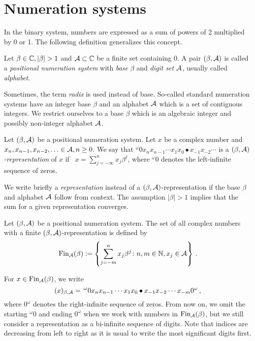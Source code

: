 
\section{Numeration systems}
In the binary system, numbers are expressed as a sum of powers of 2 multiplied by 0 or 1. The following definition generalizes this concept.
\begin{defn}
  Let $\beta \in \CC, |\beta|>1$ and $\mathcal{A} \subset \mathbb{C}$ be a finite set containing 0. A pair $(\beta, \mathcal{A})$ is called a \emph{positional numeration system} with \emph{base} $\beta$ and \emph{digit set} $\mathcal{A}$, usually called \emph{alphabet}.
\end{defn}
Sometimes, the term \emph{radix} is used instead of base. So-called standard numeration systems have an integer base $\beta$ and an alphabet $\mathcal{A}$ which is a set of contiguous integers. We restrict ourselves to a base $\beta$ which is an algebraic integer and possibly non-integer alphabet $\mathcal{A}$. 

\begin{defn}
Let $(\beta, \mathcal{A})$ be a positional numeration system. Let $x$ be a complex number and $x_n,x_{n-1}, x_{n-2},\ldots \in\mathcal{A}, n\geq 0$. We say that $^\omega0 x_n x_{n-1}\cdots x_1 x_0 \bullet x_{-1} x_{-2} \cdots $ is a \emph{$(\beta, \mathcal{A})$-representation} of $x$ if~  $x=\sum_{j=-\infty}^n x_j \beta^j$, where $^\omega0$  denotes the left-infinite sequence of zeros.
\end{defn}
 We write briefly a \emph{representation} instead of a $(\beta, \mathcal{A})$-representation if the base $\beta$ and alphabet $\mathcal{A}$ follow from context. The assumption $|\beta|>1$ implies that the sum for a given representation converges.

\begin{defn}
Let $(\beta, \mathcal{A})$ be a positional numeration system. The set of all complex numbers with a finite $(\beta, \mathcal{A})$-representation is defined by
$$
    \text{Fin}_{\mathcal{A}}(\beta):=\left\{\sum_{j=-m}^n x_j \beta^j\colon n, m \in \mathbb{N}, x_j \in \mathcal{A} \right\}\,.
$$
\end{defn}
   
For  $x\in\text{Fin}_{\mathcal{A}}(\beta)$, we write 
$$
(x)_{\beta,\mathcal{A}}=\,  ^\omega0 x_n x_{n-1}\cdots x_1 x_0 \bullet x_{-1} x_{-2} \cdots x_{-m} 0^\omega\,,
$$ 
where $0^\omega$ denotes the right-infinite sequence of zeros. From now on, we omit the starting $^\omega0$ and ending $0^\omega$ when we work with numbers in $\text{Fin}_{\mathcal{A}}(\beta)$, but we still consider a representation as a bi-infinite sequence of digits. Note that indices are decreasing from left to right as it is usual to write the most significant digits first. 

